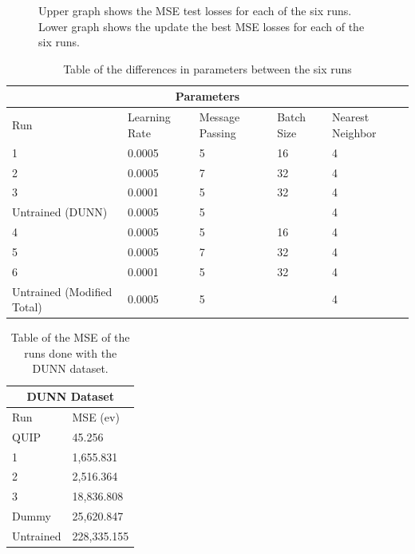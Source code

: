 \documentclass[12pt, abstract = true]{scrartcl}
\begin{document}
\begin{figure}
  \caption{Upper graph shows the MSE test losses for each of the six runs. Lower graph shows the update the best MSE losses for each of the six runs.}\label{fig:graph}
\end{figure}

\begin{table}
    \centering
    \begin{tabular}{|p{3cm}||p{2cm}|p{2cm}|p{2cm}|p{2cm}|}
    \hline
    \multicolumn{5}{|c|}{Parameters} \\
    \hline
    Run & Learning Rate & Message Passing & Batch Size & Nearest Neighbor\\
    \hline
    1 & 0.0005 & 5 & 16 & 4\\
    2 & 0.0005 & 7 & 32 & 4\\    
    3 & 0.0001 & 5 & 32 & 4\\
    Untrained (DUNN) & 0.0005 & 5 & & 4\\
    4 & 0.0005 & 5 & 16 & 4\\
    5 & 0.0005 & 7 & 32 & 4\\
    6 & 0.0001 & 5 & 32 & 4\\
    Untrained (Modified Total) & 0.0005 & 5 & & 4\\
    \hline
    
    \end{tabular}
    \caption{Table of the differences in parameters between the six runs}\label{tab:param}
\end{table}

\begin{table}
    \centering
    \begin{tabular}{p{3cm}|p{3cm}}
    \hline
    \multicolumn{2}{|c|}{DUNN Dataset} \\
    \hline
    Run  & MSE (ev)\\
    \hline
    QUIP   & 45.256\\
    1   & 1,655.831\\
    2    & 2,516.364\\
    3 & 18,836.808\\
    Dummy & 25,620.847\\
    Untrained & 228,335.155\\
    \hline
    \end{tabular}
    \caption{Table of the MSE of the runs done with the DUNN dataset.}\label{tab:dunn}
\end{table}
\end{document}
